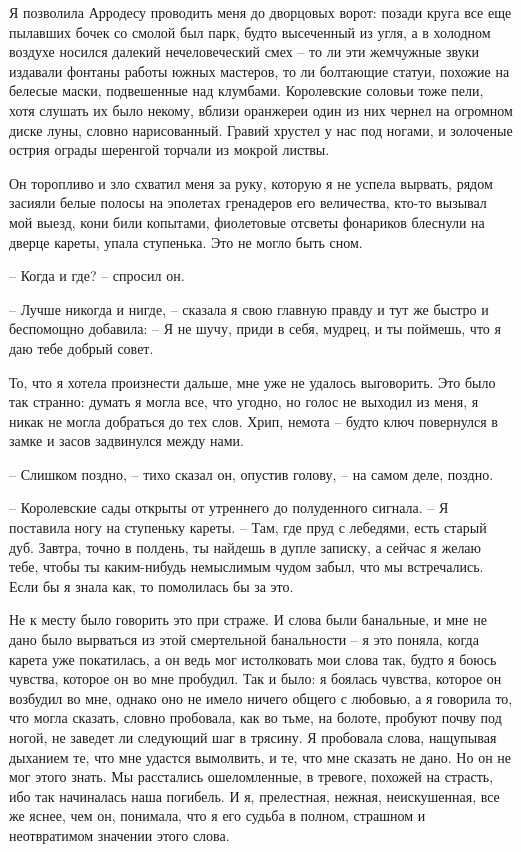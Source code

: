 Я позволила Арродесу проводить меня до дворцовых  ворот:  позади  круга
все  еще  пылавших  бочек  со смолой был парк, будто высеченный из угля, а в
холодном воздухе носился далекий нечеловеческий смех -- то ли эти  жемчужные
звуки  издавали  фонтаны  работы  южных  мастеров,  то  ли болтающие статуи,
похожие на белесые маски, подвешенные над клумбами. Королевские соловьи тоже
пели, хотя слушать их было некому, вблизи оранжереи один из  них  чернел  на
огромном диске луны, словно нарисованный. Гравий хрустел у нас под ногами, и
золоченые острия ограды шеренгой торчали из мокрой листвы.

Он  торопливо  и зло схватил меня за руку, которую я не успела вырвать,
рядом засияли белые полосы на эполетах  гренадеров  его  величества,  кто-то
вызывал мой выезд, кони били копытами, фиолетовые отсветы фонариков блеснули
на дверце кареты, упала ступенька. Это не могло быть сном.

-- Когда и где? -- спросил он.

-- Лучше  никогда  и  нигде,  -- сказала я свою главную правду и тут же
быстро и беспомощно добавила: -- Я не шучу,  приди  в  себя,  мудрец,  и  ты
поймешь, что я даю тебе добрый совет.

То, что я хотела произнести дальше,  мне уже не удалось выговорить. Это было
так странно: думать я могла все, что  угодно, но голос не выходил из меня, я
никак не могла добраться до тех  слов. Хрип, немота -- будто ключ повернулся
в замке и засов задвинулся между нами.

-- Слишком поздно, -- тихо сказал он, опустив голову, -- на самом деле,
поздно.

-- Королевские сады открыты от утреннего до полуденного сигнала.  --  Я
поставила ногу на ступеньку кареты. -- Там, где пруд с лебедями, есть старый
дуб.  Завтра,  точно в полдень, ты найдешь в дупле записку, а сейчас я желаю
тебе, чтобы ты каким-нибудь немыслимым чудом забыл, что мы встречались. Если
бы я знала как, то помолилась бы за это.

Не к месту было говорить это при страже. И слова были банальные, и  мне
не  дано  было  вырваться  из  этой смертельной банальности -- я это поняла,
когда карета уже покатилась, а он ведь мог истолковать мои слова так,  будто
я  боюсь чувства, которое он во мне пробудил. Так и было: я боялась чувства,
которое он возбудил во мне, однако оно не имело ничего общего с любовью, а я
говорила то, что могла сказать, словно пробовала, как во  тьме,  на  болоте,
пробуют  почву под ногой, не заведет ли следующий шаг в трясину. Я пробовала
слова, нащупывая дыханием те, что мне  удастся  вымолвить,  и  те,  что  мне
сказать  не  дано.  Но  он не мог этого знать. Мы расстались ошеломленные, в
тревоге, похожей  на  страсть,  ибо  так  начиналась  наша  погибель.  И  я,
прелестная,  нежная, неискушенная, все же яснее, чем он, понимала, что я его
судьба в полном, страшном и неотвратимом значении этого слова.

